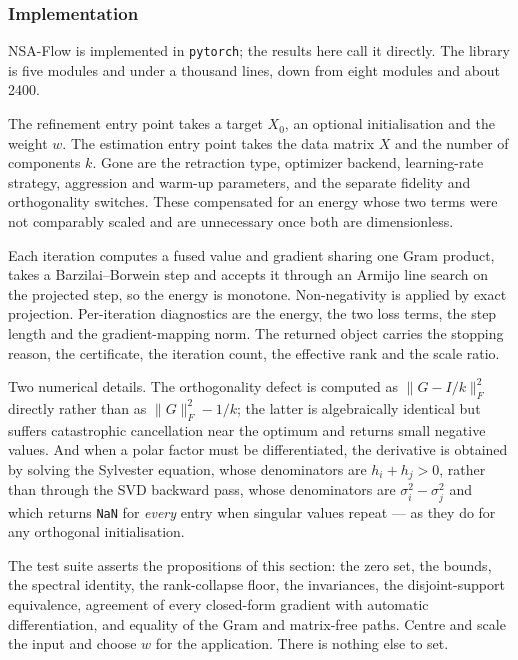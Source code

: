 \documentclass[
]{article}
\begin{document}
\subsubsection{Implementation}\label{implementation}

NSA-Flow is implemented in \texttt{pytorch}; the results here call it directly. The library is five modules and under a thousand lines, down from eight modules and about 2400.

The refinement entry point takes a target \(X_0\), an optional initialisation and the weight \(w\). The estimation entry point takes the data matrix \(X\) and the number of components \(k\). Gone are the retraction type, optimizer backend, learning-rate strategy, aggression and warm-up parameters, and the separate fidelity and orthogonality switches. These compensated for an energy whose two terms were not comparably scaled and are unnecessary once both are dimensionless.

Each iteration computes a fused value and gradient sharing one Gram product, takes a Barzilai--Borwein step and accepts it through an Armijo line search on the projected step, so the energy is monotone. Non-negativity is applied by exact projection. Per-iteration diagnostics are the energy, the two loss terms, the step length and the gradient-mapping norm. The returned object carries the stopping reason, the certificate, the iteration count, the effective rank and the scale ratio.

Two numerical details. The orthogonality defect is computed as \(\|G - I/k\|_F^2\) directly rather than as \(\|G\|_F^2 - 1/k\); the latter is algebraically identical but suffers catastrophic cancellation near the optimum and returns small negative values. And when a polar factor must be differentiated, the derivative is obtained by solving the Sylvester equation, whose denominators are \(h_i + h_j > 0\), rather than through the SVD backward pass, whose denominators are \(\sigma_i^2 - \sigma_j^2\) and which returns \texttt{NaN} for \emph{every} entry when singular values repeat --- as they do for any orthogonal initialisation.

The test suite asserts the propositions of this section: the zero set, the bounds, the spectral identity, the rank-collapse floor, the invariances, the disjoint-support equivalence, agreement of every closed-form gradient with automatic differentiation, and equality of the Gram and matrix-free paths. Centre and scale the input and choose \(w\) for the application. There is nothing else to set.
\end{document}
